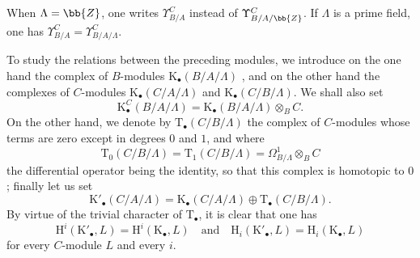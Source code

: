 \begin{env}[20.6.14]
When $\Lambda=\bb{Z}$, one writes $\Upsilon^C_{B/A}$ instead of $\Upsilon^C_{B/A/\bb{Z}}$.
If $\Lambda$ is a prime field, one has $\Upsilon^C_{B/A}=\Upsilon^C_{B/A/\Lambda}$.
\end{env}

\begin{env}[20.6.15]
\label{0.20.6.15}
To study the relations between the preceding modules, we introduce on the one hand the complex of $B$-modules $\mathrm{K}_\bullet(B/A/\Lambda)$ , and on the other hand the complexes of $C$-modules $\mathrm{K}_\bullet(C/A/\Lambda)$ and $\mathrm{K}_\bullet(C/B/\Lambda)$.
We shall also set
\begin{equation}
\tag{20.6.15.1}
  \label{0.20.6.15.1}
  \mathrm{K}^C_\bullet(B/A/\Lambda)=\mathrm{K}_\bullet(B/A/\Lambda)\otimes_B C.
\end{equation}
On the other hand, we denote by $\mathrm{T}_\bullet(C/B/\Lambda)$ the complex of $C$-modules whose terms are zero except in degrees $0$ and $1$, and where
\begin{equation}
\tag{20.6.15.2}
  \label{0.20.6.15.2}
  \mathrm{T}_0(C/B/\Lambda)=\mathrm{T}_1(C/B/\Lambda)=\Omega^1_{B/\Lambda}\otimes_B C
\end{equation}
the differential operator being the identity, so that this complex is homotopic to $0$; finally let us set
\begin{equation}
\tag{20.6.15.3}
  \label{0.20.6.15.3}
  \mathrm{K}'_\bullet(C/A/\Lambda)=\mathrm{K}_\bullet(C/A/\Lambda)\oplus\mathrm{T}_\bullet(C/B/\Lambda).
\end{equation}
By virtue of the trivial character of $\mathrm{T}_\bullet$, it is clear that one has
\begin{equation}
\tag{20.6.15.4}
  \label{0.20.6.15.4}
  \mathrm{H}^i(\mathrm{K}'_\bullet,L)=\mathrm{H}^i(\mathrm{K}_\bullet,L)\quad\text{and}\quad\mathrm{H}_i(\mathrm{K}'_\bullet,L)=\mathrm{H}_i(\mathrm{K}_\bullet,L)
\end{equation}
for every $C$-module $L$ and every $i$.
\end{env}

